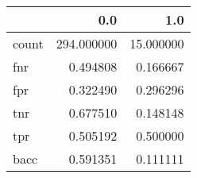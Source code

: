 \begin{tabular}{lrr}
\toprule
{} &         0.0 &        1.0 \\
\midrule
count &  294.000000 &  15.000000 \\
fnr   &    0.494808 &   0.166667 \\
fpr   &    0.322490 &   0.296296 \\
tnr   &    0.677510 &   0.148148 \\
tpr   &    0.505192 &   0.500000 \\
bacc  &    0.591351 &   0.111111 \\
\bottomrule
\end{tabular}
